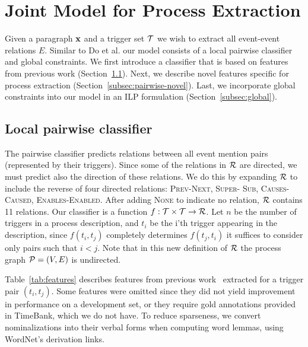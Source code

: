 \section{Joint Model for Process Extraction}

Given a paragraph $\mathbf{x}$ and a trigger set $\mathcal{T}$ we wish to extract all event-event relations $E$. Similar to Do et al.  our model consists of a local pairwise classifier and global constraints. We first introduce a classifier that is based on features from previous work (Section~\ref{subsec:pairwise}). Next, we describe novel features specific for process extraction (Section~\ref{subsec:pairwise-novel}). Last, we incorporate global constraints into our model in an ILP formulation (Section~\ref{subsec:global}).

\subsection{Local pairwise classifier} \label{subsec:pairwise}

The pairwise classifier predicts relations between all event mention pairs (represented by their triggers). Since some of the relations in $\mathcal{R}$ are directed, we must predict also the direction of these relations. We do this by expanding $\mathcal{R}$ to include the reverse of four directed relations: \textsc{Prev}-\textsc{Next},  \textsc{Super}- \textsc{Sub}, \textsc{Causes}-\textsc{Caused}, \textsc{Enables}-\textsc{Enabled}. After adding \textsc{None} to indicate no relation, $\mathcal{R}$ contains 11 relations. Our classifier is a function $f:\mathcal{T} \times \mathcal{T} \rightarrow \mathcal{R}$. Let $n$ be the number of triggers in a process description, and $t_i$ be the i'th trigger appearing in the description, since $f(t_i,t_j)$ completely determines $f(t_j,t_i)$ it suffices to consider only pairs such that $i<j$. Note that in this new definition of $\mathcal{R}$ the process graph $\mathcal{P}=(V,E)$ is undirected.

Table~\ref{tab:features} describes features from previous work~\cite{Chambers08,Do12} extracted for a trigger pair $(t_i,t_j)$. Some features were omitted since they did not yield improvement in performance on a development set, or they require gold annotations provided in TimeBank, which we do not have. To reduce sparseness, we convert nominalizations into their verbal forms when computing word lemmas, using WordNet's \cite{Fellbaum1998} derivation links.

